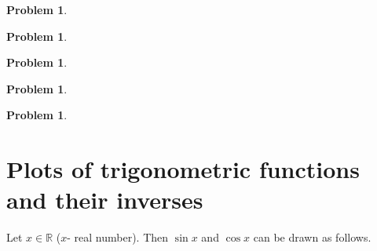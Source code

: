 \documentclass[12pt]{book}
\newtheorem{problem}[theorem]{Problem}
\begin{document}
\begin{problem}

\end{problem}

\begin{problem}

\end{problem}



\begin{problem}

\end{problem}


\begin{problem} 
\end{problem}



\begin{problem}

\end{problem}



\section{Plots of trigonometric functions and their inverses} \label{secGraphsTrigFunc}
Let $x\in \mathbb R$ ($x$- real number). Then $\sin x$ and $\cos x$ can be drawn as follows.
\end{document}
